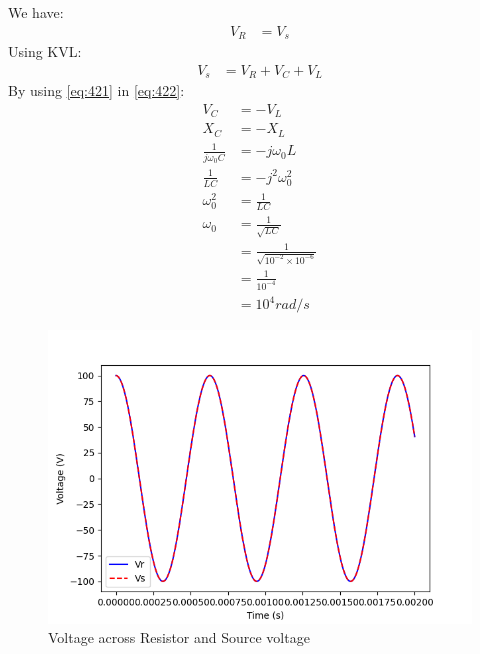 \documentclass[journal,12pt,twocolumn]{IEEEtran}
\theoremstyle{remark}
\begin{document}
\\

\\
We have:
\begin{align}
    V_R&=V_s \label{eq:421}
\end{align}
Using KVL:
\begin{align}
    V_s&=V_R+V_C+V_L\label{eq:422}
\end{align}
By using \eqref{eq:421} in \eqref{eq:422}:
\begin{align}
    V_C&=-V_L\label{eq:423}\\
    X_C&=-X_L\label{eq:424}\\
    \frac{1}{j\omega_0C}&=-j\omega_0L\label{eq:425}\\
\frac{1}{LC} &= -j^2\omega_0^{2} \label{eq:426}\\ 
\omega_0^{2}&=\frac{1}{LC}\label{eq:427}\\
\omega_0&=\frac{1}{\sqrt{LC}} \label{eq:428}\\
&=\frac{1}{\sqrt{10^{-2}\times10^{-6}}}\label{eq:429}\\
&=\frac{1}{10^{-4}}\label{eq:4210}\\
&=10^4 rad/s\label{eq:4211}
\end{align}
\begin{figure}[h]
        \centering
\includegraphics[width=\columnwidth]{2023/BM/42/figs/Figure42.png}
    \caption{Voltage across Resistor and Source voltage}
    \label{fig:plot42}
\end{figure}
\end{document}
